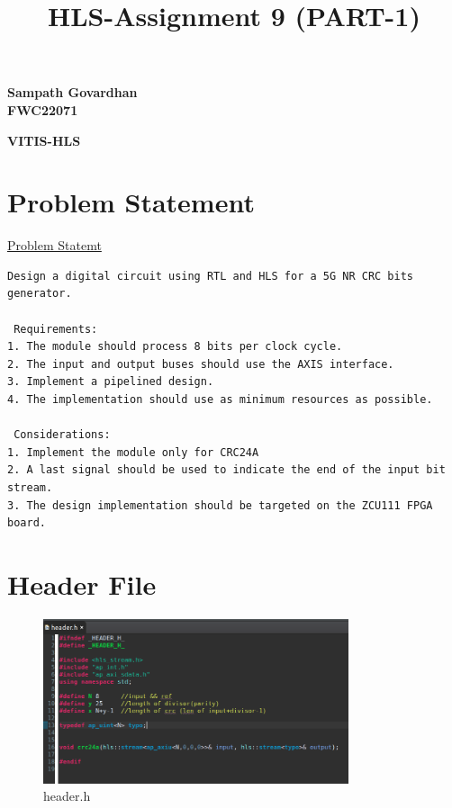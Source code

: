\documentclass{article}
\title{
HLS-Assignment 9 (PART-1) 
}
\begin{document}
\maketitle
\hfill \textbf{Sampath Govardhan} \\
\null \hfill \textbf{FWC22071}\\
\maketitle
\hfill \textbf{VITIS-HLS}
\section{Problem Statement}
\href{run:./problem_statement.pdf} {Problem Statemt}
\begin{lstlisting}
Design a digital circuit using RTL and HLS for a 5G NR CRC bits generator.

 Requirements: 
1. The module should process 8 bits per clock cycle.
2. The input and output buses should use the AXIS interface.
3. Implement a pipelined design.
4. The implementation should use as minimum resources as possible.

 Considerations:
1. Implement the module only for CRC24A
2. A last signal should be used to indicate the end of the input bit stream.
3. The design implementation should be targeted on the ZCU111 FPGA board.
\end{lstlisting}
\vspace{1cm}
\section{Header File}
\vspace{1cm}
\begin{figure}[h]
\centering
\includegraphics[width=0.8\textwidth]{figs/p1header.png}
    \caption{header.h}
    \label{fig:my_label}
\end{figure}

\vspace{15cm}
\end{document}
